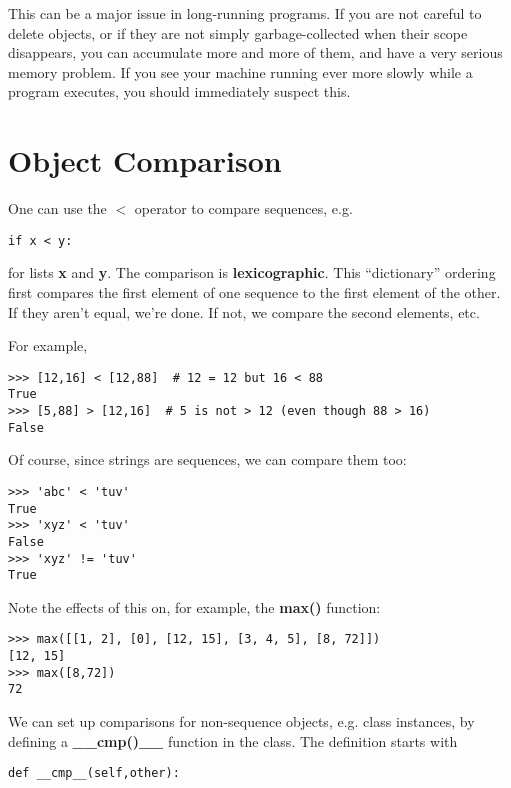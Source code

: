 This can be a major issue in long-running programs.  If you are not
careful to delete objects, or if they are not simply garbage-collected
when their scope disappears, you can accumulate more and more of them,
and have a very serious memory problem.  If you see your machine running
ever more slowly while a program executes, you should immediately
suspect this.

\section{Object Comparison}  
\label{cmp}

One can use the $<$ operator to compare sequences, e.g.

\begin{Verbatim}[fontsize=\relsize{-2}]
if x < y:
\end{Verbatim}

for lists {\bf x} and {\bf y}.  The comparison is {\bf lexicographic}.
This ``dictionary'' ordering first compares the first element of one
sequence to the first element of the other.  If they aren't equal, we're
done.  If not, we compare the second elements, etc.

For example,

\begin{Verbatim}[fontsize=\relsize{-2}]
>>> [12,16] < [12,88]  # 12 = 12 but 16 < 88
True
>>> [5,88] > [12,16]  # 5 is not > 12 (even though 88 > 16)
False
\end{Verbatim}

Of course, since strings are sequences, we can compare them too:

\begin{Verbatim}[fontsize=\relsize{-2}]
>>> 'abc' < 'tuv'
True
>>> 'xyz' < 'tuv'
False
>>> 'xyz' != 'tuv'
True
\end{Verbatim}

Note the effects of this on, for example, the {\bf max()} function:

\begin{Verbatim}[fontsize=\relsize{-2}]
>>> max([[1, 2], [0], [12, 15], [3, 4, 5], [8, 72]])
[12, 15]
>>> max([8,72])
72
\end{Verbatim}

We can set up comparisons for non-sequence objects, e.g. class
instances, by defining a {\bf \_\_cmp()\_\_} function in the class.
The definition starts with

\begin{Verbatim}[fontsize=\relsize{-2}]
def __cmp__(self,other):
\end{Verbatim}

